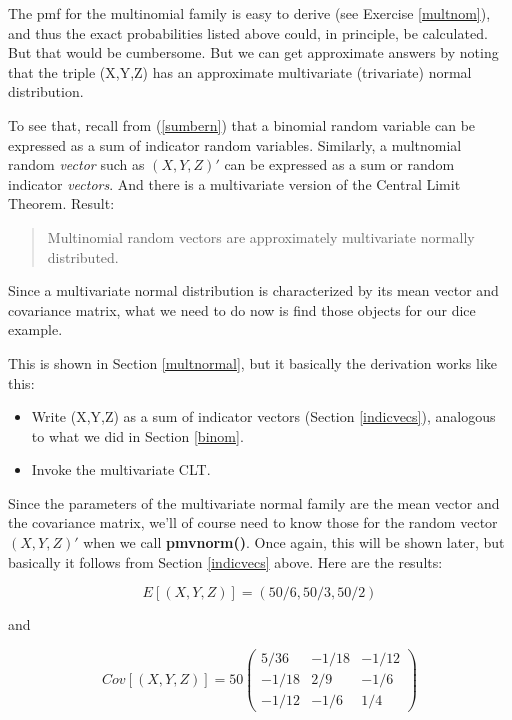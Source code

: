 The pmf for the multinomial family is easy to derive (see Exercise
\ref{multnom}), and thus the exact probabilities listed above could, in
principle, be calculated.  But that would be cumbersome.  But we can get
approximate answers by noting that the triple (X,Y,Z) has an approximate
multivariate (trivariate) normal distribution.  

To see that, recall from (\ref{sumbern}) that a binomial random variable
can be expressed as a sum of indicator random variables.  Similarly, a
multnomial random {\it vector} such as $(X,Y,Z)'$ can be expressed as a
sum or random indicator {\it vectors}.  And there is a multivariate
version of the Central Limit Theorem.  Result:

\begin{quote}
Multinomial random vectors are approximately multivariate normally
distributed.
\end{quote}

Since a multivariate normal distribution is characterized by its mean
vector and covariance matrix, what we need to do now is find those
objects for our dice example.


This is shown in Section \ref{multnormal}, but it
basically the derivation works like this:

\begin{itemize}

\item Write (X,Y,Z) as a sum of indicator vectors (Section
\ref{indicvecs}), analogous to what we did in Section \ref{binom}.

\item Invoke the multivariate CLT.

\end{itemize}

Since the parameters of the multivariate normal family are the mean
vector and the covariance matrix, we'll of course need to know those for
the random vector $(X,Y,Z)'$ when we call {\bf pmvnorm()}.  Once again,
this will be shown later, but basically it follows from Section
\ref{indicvecs} above.  Here are the results:

\begin{equation}
E[(X,Y,Z)] = (50/6, 50/3, 50/2)
\end{equation}

and

\begin{equation}
Cov[(X,Y,Z)] =  
50
\begin{pmatrix}
5/36 & -1/18 & -1/12 \\
-1/18 & 2/9 & -1/6 \\
-1/12 & -1/6 & 1/4 
\end{pmatrix}
\end{equation}

